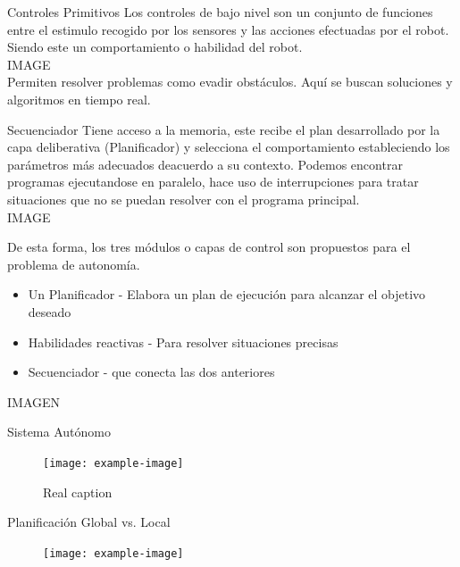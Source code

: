 \documentclass[
	11pt, %
]{beamer}
\begin{document}
\begin{frame}{Controles Primitivos}
  Los controles de bajo nivel son un conjunto de funciones entre el estimulo recogido por los sensores y las acciones efectuadas por el robot. Siendo este un comportamiento o habilidad del robot.\\
  IMAGE\\
  Permiten resolver problemas como evadir obst\'{a}culos. Aqu\'{i} se buscan soluciones y algoritmos en tiempo real.
\end{frame}

\begin{frame}{Secuenciador}
  Tiene acceso a la memoria, este recibe el plan desarrollado por la capa deliberativa (Planificador) y selecciona el comportamiento estableciendo los par\'{a}metros m\'{a}s adecuados deacuerdo a su contexto. Podemos encontrar programas ejecutandose en paralelo, hace uso de interrupciones para tratar situaciones que no se puedan resolver con el programa principal.\\
  IMAGE\\
  
\end{frame}

\begin{frame}{}
  De esta forma, los tres m\'{o}dulos o capas de control son propuestos para el problema de autonom\'{i}a.
  \begin{itemize}
  \item Un Planificador - Elabora un plan de ejecuci\'{o}n para alcanzar el objetivo deseado
  \item Habilidades reactivas - Para resolver situaciones precisas
  \item Secuenciador - que conecta las dos anteriores
  \end{itemize}
  IMAGEN
\end{frame}

\begin{frame}{Sistema Aut\'{o}nomo}
  
  \begin{figure}
    \centering
    \texttt{[image: example-image]}
    \caption[Caption for LOF]{Real caption\protect\footnotemark}
  \end{figure}
\end{frame}

\begin{frame}{Planificaci\'{o}n Global vs. Local}
  \begin{figure}
    \centering
    \texttt{[image: example-image]}
  \end{figure}
\end{frame}
\end{document}
